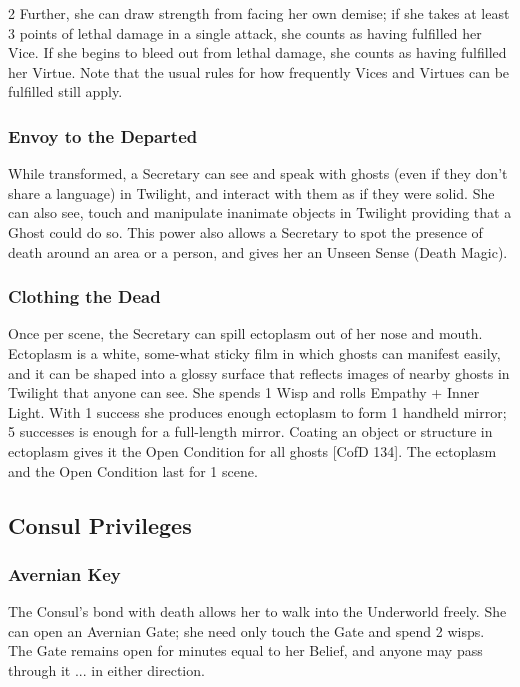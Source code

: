 \begin{multicols}{2}
Further, she can draw strength from facing her own demise; if she takes at least 3 points of lethal damage in a single attack, she counts as having fulfilled her Vice. If she begins to bleed out from lethal damage, she counts as having fulfilled her Virtue. Note that the usual rules for how frequently Vices and Virtues can be fulfilled still apply.

\subsubsection*{Envoy to the Departed}

While transformed, a Secretary can see and speak with ghosts (even if they don’t share a language) in Twilight, and interact with them as if they were solid. She can also see, touch and manipulate inanimate objects in Twilight providing that a Ghost could do so. This power also allows a Secretary to spot the presence of death around an area or a person, and gives her an Unseen Sense (Death Magic).

\subsubsection*{Clothing the Dead}

Once per scene, the Secretary can spill ectoplasm out of her nose and mouth. Ectoplasm is a white, some-what sticky film in which ghosts can manifest easily, and it can be shaped into a glossy surface that reflects images of nearby ghosts in Twilight that anyone can see. She spends 1 Wisp and rolls Empathy + Inner Light. With 1 success she produces enough ectoplasm to form 1 handheld mirror; 5 successes is enough for a full-length mirror. Coating an object or structure in ectoplasm gives it the Open Condition for all ghosts [CofD 134]. The ectoplasm and the Open Condition last for 1 scene.

\subsection*{Consul Privileges}

\subsubsection*{Avernian Key}

The Consul's bond with death allows her to walk into the Underworld freely. She can open an Avernian Gate; she need only touch the Gate and spend 2 wisps. The Gate remains open for minutes equal to her Belief, and anyone may pass through it ... in either direction.


\end{multicols}
